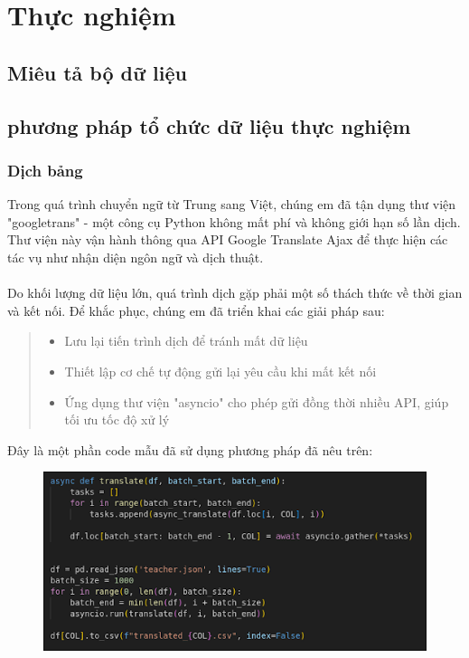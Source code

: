 \section{Thực nghiệm}
\subsection{Miêu tả bộ dữ liệu}
\subsection{phương pháp tổ chức dữ liệu thực nghiệm}
\subsubsection{Dịch bảng}
Trong quá trình chuyển ngữ từ Trung sang Việt, chúng em đã tận dụng thư viện "googletrans" - một công cụ Python không mất phí và không giới hạn số lần dịch. Thư viện này vận hành thông qua API Google Translate Ajax để thực hiện các tác vụ như nhận diện ngôn ngữ và dịch thuật.\\
\\
Do khối lượng dữ liệu lớn, quá trình dịch gặp phải một số thách thức về thời gian và kết nối. Để khắc phục, chúng em đã triển khai các giải pháp sau:
\begin{quote}
\begin{itemize}
    \item Lưu lại tiến trình dịch để tránh mất dữ liệu
    \item Thiết lập cơ chế tự động gửi lại yêu cầu khi mất kết nối
    \item Ứng dụng thư viện "asyncio" cho phép gửi đồng thời nhiều API, giúp tối ưu tốc độ xử lý
\end{itemize}
\end{quote}
Đây là một phần code mẫu đã sử dụng phương pháp đã nêu trên:\\
\begin{figure}[h]
    \centering
    \includegraphics[width=0.75\linewidth]{figures/1.png}
\end{figure}
